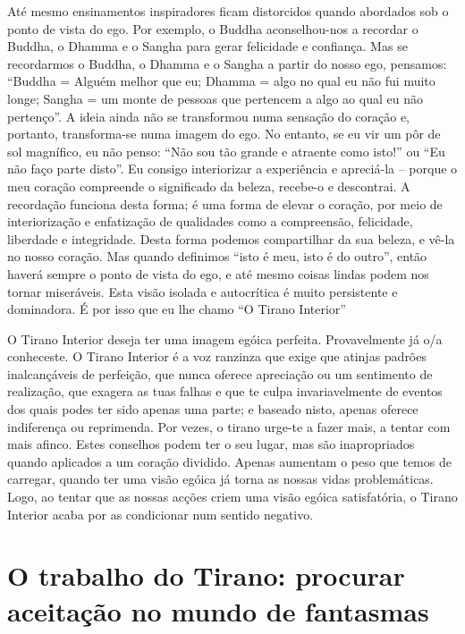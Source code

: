 \sectionBreak

Até mesmo ensinamentos inspiradores ficam distorcidos quando abordados
sob o ponto de vista do ego. Por exemplo, o Buddha aconselhou-nos a
recordar o Buddha, o Dhamma e o Sangha para gerar felicidade e
confiança. Mas se recordarmos o Buddha, o Dhamma e o Sangha a partir do
nosso ego, pensamos: “Buddha = Alguém melhor que eu; Dhamma = algo no
qual eu não fui muito longe; Sangha = um monte de pessoas que pertencem
a algo ao qual eu não pertenço”. A ideia ainda não se transformou numa
sensação do coração e, portanto, transforma-se numa imagem do ego. No
entanto, se eu vir um pôr de sol magnífico, eu não penso: “Não sou tão
grande e atraente como isto!” ou “Eu não faço parte disto”. Eu consigo
interiorizar a experiência e apreciá-la -- porque o meu coração
compreende o significado da beleza, recebe-o e descontrai. A recordação
funciona desta forma; é uma forma de elevar o coração, por meio de
interiorização e enfatização de qualidades como a compreensão,
felicidade, liberdade e integridade. Desta forma podemos compartilhar da
sua beleza, e vê-la no nosso coração. Mas quando definimos ``isto é meu,
isto é do outro”, então haverá sempre o ponto de vista do ego, e até
mesmo coisas lindas podem nos tornar miseráveis. Esta visão isolada e
autocrítica é muito persistente e dominadora. É por isso que eu lhe
chamo “O Tirano Interior”

O Tirano Interior deseja ter uma imagem egóica perfeita. Provavelmente
já o/a conheceste. O Tirano Interior é a voz ranzinza que exige que
atinjas padrões inalcançáveis de perfeição, que nunca oferece apreciação
ou um sentimento de realização, que exagera as tuas falhas e que te
culpa invariavelmente de eventos dos quais podes ter sido apenas uma
parte; e baseado nisto, apenas oferece indiferença ou reprimenda. Por
vezes, o tirano urge-te a fazer mais, a tentar com mais afinco. Estes
conselhos podem ter o seu lugar, mas são inapropriados quando aplicados
a um coração dividido. Apenas aumentam o peso que temos de carregar,
quando ter uma visão egóica já torna as nossas vidas problemáticas.
Logo, ao tentar que as nossas acções criem uma visão egóica
satisfatória, o Tirano Interior acaba por as condicionar num sentido
negativo.

\section{O trabalho do Tirano: procurar aceitação no mundo de
fantasmas}

